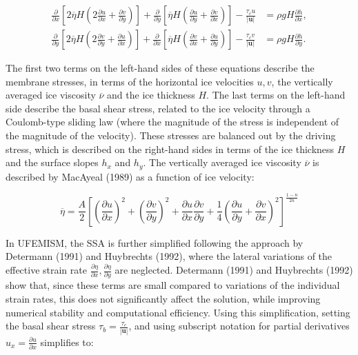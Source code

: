 \documentclass{article}
\begin{document}
\begin{align} \label{eq:SSA}
\frac{\partial}{\partial x} \left[ 2 \overline{\eta} H \left( 2 \frac{\partial u}{\partial x} + \frac{\partial v}{\partial y} \right) \right] +
\frac{\partial}{\partial y} \left[    \overline{\eta} H \left(    \frac{\partial u}{\partial y} + \frac{\partial v}{\partial x} \right) \right] -
\frac{\tau_c u}{|\textbf{u}|} &= \rho g H \frac{\partial h}{\partial x}, \\
\frac{\partial}{\partial y} \left[ 2 \overline{\eta} H \left( 2 \frac{\partial v}{\partial y} + \frac{\partial u}{\partial x} \right) \right] +
\frac{\partial}{\partial x} \left[    \overline{\eta} H \left(    \frac{\partial v}{\partial x} + \frac{\partial u}{\partial y} \right) \right] -
\frac{\tau_c v}{|\textbf{u}|} &= \rho g H \frac{\partial h}{\partial y}.
\end{align}

The first two terms on the left-hand sides of these equations describe the membrane stresses, in terms of the horizontal ice velocities $u,v$, the vertically averaged ice viscosity $\overline{\nu}$ and the ice thickness $H$. The last terms on the left-hand side describe the basal shear stress, related to the ice velocity through a Coulomb-type sliding law (where the magnitude of the stress is independent of the magnitude of the velocity). These stresses are balanced out by the driving stress, which is described on the right-hand sides in terms of the ice thickness $H$ and the surface slopes $h_x$ and $h_y$. The vertically averaged ice viscosity $\overline{\nu}$ is described by MacAyeal (1989) as a function of ice velocity:

\begin{equation} \label{eq:SSA_nu}
\overline{\eta} = \frac{A}{2} {\left[ 
{\left( \frac{\partial u}{\partial x} \right)}^2 + 
{\left( \frac{\partial v}{\partial y} \right)}^2 + 
\frac{\partial u}{\partial x} \frac{\partial v}{\partial y} + 
\frac14 {\left( \frac{\partial u}{\partial y} + \frac{\partial v}{\partial x} \right) }^2
\right]}^{\frac{1-n}{2n}}
\end{equation}

In UFEMISM, the SSA is further simplified following the approach by Determann (1991) and Huybrechts (1992), where the lateral variations of the effective strain rate $\frac{\partial \eta}{\partial x}, \frac{\partial \eta}{\partial y}$ are neglected. Determann (1991) and Huybrechts (1992) show that, since these terms are small compared to variations of the individual strain rates, this does not significantly affect the solution, while improving numerical stability and computational efficiency. Using this simplification, setting the basal shear stress $\tau_b = \frac{\tau_c}{|\textbf{u}|}$, and using subscript notation for partial derivatives $u_x = \frac{\partial u}{\partial x}$ simplifies to:
\end{document}
